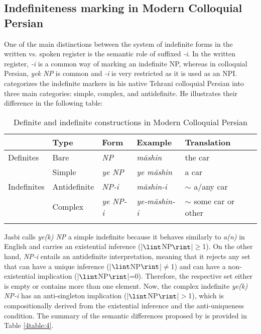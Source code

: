 \documentclass[output=paper]{langsci/langscibook}
\begin{document}
\subsection{Indefiniteness marking in Modern Colloquial Persian}\label{4sec:33}

One of the main distinctions between the system of indefinite forms in the written vs. spoken register is the semantic role of suffixed {\emph{-i}}. In the written register, {\emph{-i}} is a common way of marking an indefinite NP, whereas in colloquial Persian, {\emph{yek NP}} is common and {\emph{-i}} is very restricted as it is used as an NPI. \cite[][246]{jasbi:16} categorizes the indefinite markers in his native Tehrani colloquial Persian into three main categories: simple, complex, and antidefinite. He illustrates their difference in the following table:

\begin{table}

\begin{tabularx}{\textwidth}{Xllll}
\lsptoprule
	& Type		& Form		& Example	& Translation \\
\midrule
Definites & Bare & {\emph{NP}} & {\emph{māshin}} & the car \\[1mm]
\hdashline
			& Simple & {\emph{ye NP}}	 & {\emph{ye māshin}} & a car \\
Indefinites	 	& Antidefinite & {\emph{NP-i}} & {\emph{māshin-i}}	 & $\sim$ a/any car \\
			& Complex & {\emph{ye NP-i}} & {\emph{ye-māshin-i}} & $\sim$ some car or other \\
\lspbottomrule
\end{tabularx}
\caption{Definite and indefinite constructions in Modern Colloquial \mbox{Persian} \citep[][246]{jasbi:16}}\label{4table:3}
\end{table}

Jasbi calls {\emph{ye(k) NP}} a simple indefinite because it behaves similarly to {\emph{a(n)}} in English and carries an existential inference (|$\lint$NP$\rint$|$\geq$1). On the other hand, {\emph{NP-i}} entails an antidefinite interpretation, meaning that it rejects any set that can have a unique inference (|$\lint$NP$\rint$|$\not=$1) and can have a non-existential implication (|$\lint$NP$\rint$|=0). Therefore, the respective set either is empty or contains more than one element. Now, the complex indefinite {\emph{ye(k) NP-i}} has an anti-singleton implication (|$\lint$NP$\rint$|$>$1), which is compositionally derived from the existential inference and the anti-uniqueness condition. The summary of the semantic differences proposed by \cite[][251]{jasbi:16} is provided in Table \ref{4table:4}.
\end{document}
